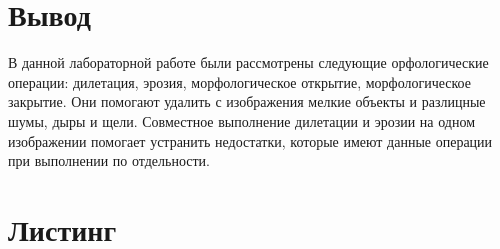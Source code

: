 \section{Вывод}

В данной лабораторной работе были рассмотрены следующие орфологические операции: дилетация, эрозия, морфологическое открытие, морфологическое закрытие. Они помогают удалить с изображения мелкие объекты и разлицные шумы, дыры и щели. Совместное выполнение дилетации и эрозии на одном изображении помогает устранить недостатки, которые имеют данные операции при выполнении по отдельности.

\vfill %

\newpage
\section{Листинг}


\parindent=1cm


